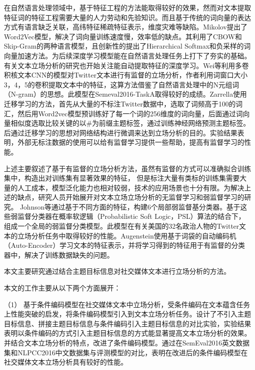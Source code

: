 在自然语言处理领域中，基于特征工程的方法能取得较好的效果，然而对文本提取特征词的特征工程需要大量的人力劳动和先验知识。而且基于传统的词向量的表达方式有语言缺乏关联，高纬特征稀疏特征表示，维度灾难等缺陷。Mikolov提出了Word2Vec模型，解决了词向量训练速度慢，效率低的缺点。其利用了CBOW和Skip-Gram的两种语言模型，且创新性的提出了Hierarchical Softmax和负采样的词向量加速方法。为后续深度学习模型能在自然语言处理任务上打下了夯实的基础。有关文本立场分析的研究也开始关注能自动提取特征的深度学习。Wei\cite{wei2016pkudblab}等利用多卷积核文本CNN的模型对Twitter文本进行有监督的立场分析，作者利用词窗口大小3，4，5的卷积提取文本中的特征，这算方法借鉴了自然语言处理中的N元组词（N-gram）的思想。此模型在Semeval2016-TaskA取得较好的成绩。Zarrella使用迁移学习的方法，首先从大量的不标注Twitter数据中，选取了词频高于100的词汇，然后用Word2vec模型预训练好了每一个词的256维度的词向量，后面通过词向量相似度选取比较关键的以\#为前缀主题标签，通过训练神经网络预测主题标签。后通过迁移学习的思想对网络结构进行微调来达到立场分析的目的。实验结果表明，外部无标注数据的使用可以给有监督学习提供一些帮助，提高有监督学习的性能。

上述主要叙述了基于有监督的立场分析方法，虽然有监督的方式可以准确拟合训练集中，构造出对训练集有显著效果的特征， 但是标注大量有类标的训练集需要大量的人工成本，模型泛化能力也相对较弱，技术的应用场景也十分有限。为解决上述的缺点，研究人员开始展开对文本立场立场分析的无监督学习和弱监督学习的研究。 Johnson等通过基于不同方面的特征，构建6个局部弱监督基分类器。基于这些弱监督分类器在概率软逻辑（Probabilistic Soft Logic，PSL）算法的结合下，组成一个全局的弱监督分类模型。此模型在有关美国的32名政治人物的Twitter文本的立场分析任务中取得较好的性能。Augenstein使用基于词袋的自动编码机（Auto-Encoder）学习文本的特征表示，并将学习得到的特征用于有监督的分类器中，解决了训练数据缺失的问题。





本文主要研究通过结合主题目标信息对社交媒体文本进行立场分析的方法。

本文的工作主要从以下两个方面展开：

（1） 基于条件编码模型在社交媒体文本中立场分析，受条件编码在文本蕴含任务上性能突破的启发，将条件编码模型引入到文本立场分析任务。设计了不引入主题目标信息、拼接主题目标信息与条件编码引入主题目标信息的对比实验，实验结果表明以条件编码的方式引入主题目标信息的方式能显著提高文本立场分析的效果。并结合文本立场分析的特点，改进了条件编码模型。通过在SemEval2016英文数据集和NLPCC2016中文数据集与评测模型的对比，表明在改进后的条件编码模型在社交媒体文本立场分析具有较好的性能。


